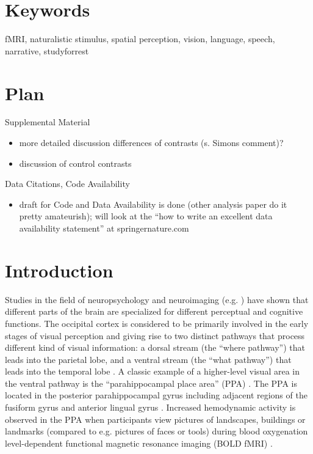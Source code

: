 \documentclass[english]{article}
\begin{document}
\section*{Keywords}
fMRI, naturalistic stimulus, spatial perception, vision, language, speech,
narrative, studyforrest

\pagebreak[4]


\section*{Plan}

\noindent Supplemental Material
\begin{itemize}
    \item more detailed discussion differences of contrasts (s. Simons comment)?
    \item discussion of control contrasts
\end{itemize}


\noindent Data Citations, Code Availability
\begin{itemize}
    \item draft for Code and Data Availability is done (other analysis paper do
        it pretty amateurish); will look at the ``how to write an excellent
        data availability statement'' at springernature.com
\end{itemize}

\pagebreak[4]


\section{Introduction}


Studies in the field of neuropsychology and neuroimaging (e.g.
\citep{penfield1950cerebral, fox1984noninvasive}) have shown that different
parts of the brain are specialized for different perceptual and cognitive
functions.
The occipital cortex is considered to be primarily involved in the early stages
of visual perception and giving rise to two distinct pathways that process
different kind of visual information:
a dorsal stream (the ``where pathway'') that leads into the parietal lobe, and a
ventral stream (the ``what pathway'') that leads into the temporal lobe
\citep{goodale1992separate, mishkin1982contribution}.
A classic example of a higher-level visual area in the ventral pathway is the
``parahippocampal place area'' (PPA) \citep{epstein1998ppa,
epstein1999parahippocampal}.
The PPA is located in the posterior parahippocampal gyrus including adjacent
regions of the fusiform gyrus and anterior lingual gyrus
\citep{epstein2008parahippocampal}.
Increased hemodynamic activity is observed in the PPA when participants view
pictures of landscapes, buildings or landmarks (compared to e.g. pictures of
faces or tools) during blood oxygenation level-dependent functional magnetic
resonance imaging (BOLD fMRI) \citep{aguirre1998area, epstein2014neural,
epstein1998ppa, troiani2012object}.
\end{document}
